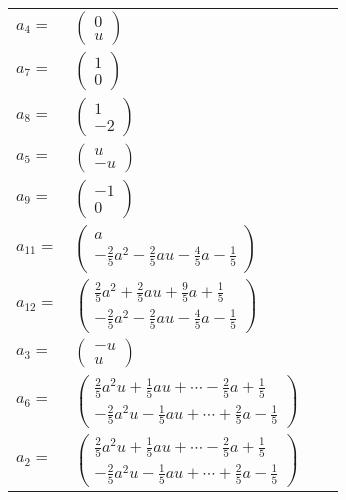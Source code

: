 \documentclass[1p]{elsarticle_modified}
\theoremstyle{definition}
\begin{document}
\begin{tabular}{m{7pt} m{180pt} m{7pt} m{180pt} }
\flushright $a_{4}=$&$\begin{pmatrix}0\\u\end{pmatrix}$ \\
\flushright $a_{7}=$&$\begin{pmatrix}1\\0\end{pmatrix}$ \\
\flushright $a_{8}=$&$\begin{pmatrix}1\\-2\end{pmatrix}$ \\
\flushright $a_{5}=$&$\begin{pmatrix}u\\- u\end{pmatrix}$ \\
\flushright $a_{9}=$&$\begin{pmatrix}-1\\0\end{pmatrix}$ \\
\flushright $a_{11}=$&$\begin{pmatrix}a\\-\frac{2}{5} a^2-\frac{2}{5} a u-\frac{4}{5} a-\frac{1}{5}\end{pmatrix}$ \\
\flushright $a_{12}=$&$\begin{pmatrix}\frac{2}{5} a^2+\frac{2}{5} a u+\frac{9}{5} a+\frac{1}{5}\\-\frac{2}{5} a^2-\frac{2}{5} a u-\frac{4}{5} a-\frac{1}{5}\end{pmatrix}$ \\
\flushright $a_{3}=$&$\begin{pmatrix}- u\\u\end{pmatrix}$ \\
\flushright $a_{6}=$&$\begin{pmatrix}\frac{2}{5} a^2 u+\frac{1}{5} a u+\cdots-\frac{2}{5} a+\frac{1}{5}\\-\frac{2}{5} a^2 u-\frac{1}{5} a u+\cdots+\frac{2}{5} a-\frac{1}{5}\end{pmatrix}$ \\
\flushright $a_{2}=$&$\begin{pmatrix}\frac{2}{5} a^2 u+\frac{1}{5} a u+\cdots-\frac{2}{5} a+\frac{1}{5}\\-\frac{2}{5} a^2 u-\frac{1}{5} a u+\cdots+\frac{2}{5} a-\frac{1}{5}\end{pmatrix}$ \\

\end{tabular}
\end{document}
